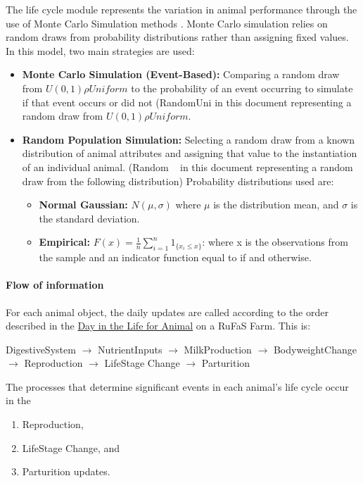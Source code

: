 \documentclass{article}
\begin{document}
\begin{refsection}
The life cycle module represents the variation in animal performance through the use of Monte Carlo Simulation methods \parencite{reuven2017}. Monte Carlo simulation relies on random draws from probability distributions rather than assigning fixed values. In this model, two main strategies are used: 
\begin{itemize}
    \item \textbf{Monte Carlo Simulation (Event-Based):} Comparing a random draw from \(U(0,1) \rho Uniform\) to the probability of an event occurring to simulate if that event occurs or did not (RandomUni in this document representing a random draw from \(U(0,1) \rho Uniform\).
    \item \textbf{Random Population Simulation: }Selecting a random draw from a known distribution of animal attributes and assigning that value to the instantiation of an individual animal. (Random ~ in this document representing a random draw from the following distribution) Probability distributions used are:
    \begin{itemize}
        \item \textbf{Normal Gaussian:} \(N(\mu, \sigma)\) where \(\mu\) is the distribution mean, and \(\sigma\) is the standard deviation. 
        \item \textbf{Empirical:} \(F(x)=\frac{1}{n}\sum_{i=1}^n 1_{\{x_i \leq x\}}\): where x is the observations from the sample and an indicator function equal to if and otherwise.
    \end{itemize}
\end{itemize}

\paragraph{Flow of information}

For each animal object, the daily updates are called according to the order described in the \hyperref[sec:ADAY]{Day in the Life for Animal} on a RuFaS Farm. This is:
\setlength{\parskip}{1em}

\setlength{\parindent}{0pt} DigestiveSystem $\rightarrow$ NutrientInputs $\rightarrow$ MilkProduction $\rightarrow$ BodyweightChange $\rightarrow$ Reproduction $\rightarrow$ LifeStage Change $\rightarrow$ Parturition
\setlength{\parskip}{1em}


The processes that determine significant events in each animal’s life cycle occur in the 
\begin{enumerate}
    \item Reproduction, 
    \item LifeStage Change, and 
    \item Parturition updates.
\end{enumerate}


\end{refsection}
\end{document}
